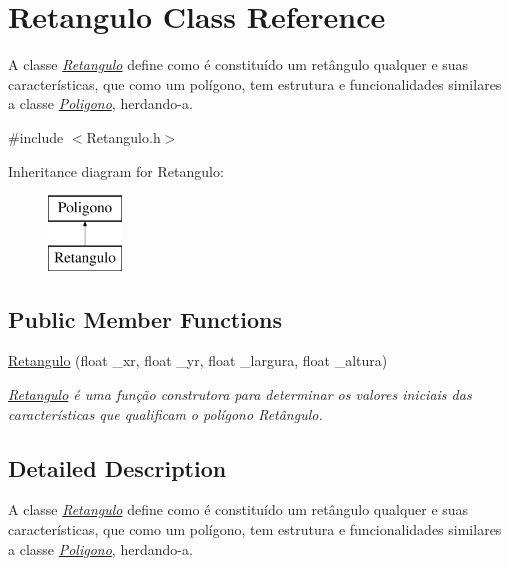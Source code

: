 \hypertarget{class_retangulo}{}\section{Retangulo Class Reference}
\label{class_retangulo}


A classe {\itshape \hyperlink{class_retangulo}{Retangulo}} define como é constituído um retângulo qualquer e suas características, que como um polígono, tem estrutura e funcionalidades similares a classe {\itshape \hyperlink{class_poligono}{Poligono}}, herdando-\/a.  




{\ttfamily \#include $<$Retangulo.\+h$>$}

Inheritance diagram for Retangulo\+:\begin{figure}[H]
\begin{center}
\leavevmode
\includegraphics[height=2.000000cm]{class_retangulo}
\end{center}
\end{figure}
\subsection*{Public Member Functions}
\begin{DoxyCompactItemize}
\item 
\hyperlink{class_retangulo_aa2b4dbc14d20e086d8577194af97ef86}{Retangulo} (float \+\_\+xr, float \+\_\+yr, float \+\_\+largura, float \+\_\+altura)
\begin{DoxyCompactList}\small\item\em {\itshape \hyperlink{class_retangulo}{Retangulo}} é uma função construtora para determinar os valores iniciais das características que qualificam o polígono Retângulo. \end{DoxyCompactList}\end{DoxyCompactItemize}


\subsection{Detailed Description}
A classe {\itshape \hyperlink{class_retangulo}{Retangulo}} define como é constituído um retângulo qualquer e suas características, que como um polígono, tem estrutura e funcionalidades similares a classe {\itshape \hyperlink{class_poligono}{Poligono}}, herdando-\/a. 

